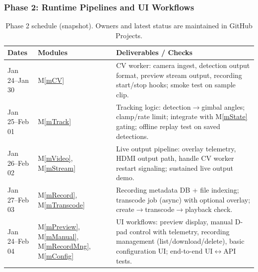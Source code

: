 \documentclass[12pt, titlepage]{article}
\newcommand{\mref}[1]{M\ref{#1}}
\begin{document}
\subsubsection{Phase 2: Runtime Pipelines and UI Workflows}
\renewcommand{\arraystretch}{1.15}
\begin{table}[H]
  \centering
  \begin{tabular}{|p{2.6cm}|p{5.2cm}|p{6.2cm}|}
    \hline
    \textbf{Dates}                                                     & \textbf{Modules} & \textbf{Deliverables / Checks} \\
    \hline
    Jan 24--Jan 30                                                     &
    \mref{mCV}                                                         &
    CV worker: camera ingest, detection output format, preview stream output,
    recording start/stop hooks; smoke test on sample clip.                                                                 \\
    \hline
    Jan 25--Feb 01                                                     &
    \mref{mTrack}                                                      &
    Tracking logic: detection$\rightarrow$gimbal angles; clamp/rate limit; integrate
    with \mref{mState} gating; offline replay test on saved detections.                                                    \\
    \hline
    Jan 26--Feb 02                                                     &
    \mref{mVideo}, \mref{mStream}                                      &
    Live output pipeline: overlay telemetry, HDMI output path, handle CV worker
    restart signaling; sustained live output demo.                                                                         \\
    \hline
    Jan 27--Feb 03                                                     &
    \mref{mRecord}, \mref{mTranscode}                                  &
    Recording metadata DB + file indexing; transcode job (async) with optional overlay;
    create$\rightarrow$transcode$\rightarrow$playback check.                                                               \\
    \hline
    Jan 24--Feb 04                                                     &
    \mref{mPreview}, \mref{mManual}, \mref{mRecordMng}, \mref{mConfig} &
    UI workflows: preview display, manual D-pad control with telemetry, recording
    management (list/download/delete), basic configuration UI; end-to-end UI$\leftrightarrow$API tests.                    \\
    \hline
  \end{tabular}
  \caption{Phase 2 schedule (snapshot). Owners and latest status are maintained in GitHub Projects.}
  \label{TblTimelineP2}
\end{table}
\end{document}
